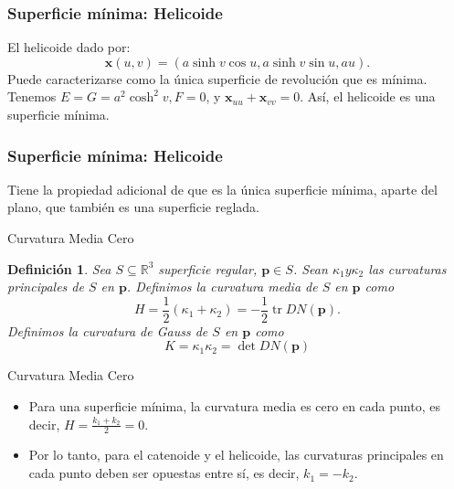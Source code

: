 \documentclass[10pt]{beamer}
\newtheorem{definicion}{Definición}
\begin{document}

  \begin{frame}
    \frametitle{Superficie mínima: Helicoide}
    El helicoide dado por: 
    $$
    \mathbf{x}(u, v)=(a \sinh v \cos u, a \sinh v \sin u, a u) .
    $$
    Puede caracterizarse como la única superficie de revolución que es mínima. Tenemos  \(E=G=a^2 \cosh ^2 v,F=0\), y \(\mathbf{x}_{u u}+\mathbf{x}_{v v}=0\). Así, el helicoide es una superficie mínima.
  \end{frame}
  
  \begin{frame}
    \frametitle{Superficie mínima: Helicoide}

    Tiene la propiedad adicional de que
  es la única superficie mínima, aparte del plano, que también es una superficie reglada.
  \end{frame}
  

  
  \begin{frame}{Curvatura Media Cero}
    \begin{cajita}
      \begin{definicion}
        Sea $S \subseteq \mathbb{R}^3$ superficie regular, $\mathbf{p} \in S$. Sean $\kappa_1 y \kappa_2$ las curvaturas principales de $S$ en $\mathbf{p}$. Definimos la curvatura media de $S$ en $\mathbf{p}$ como
  $$
  H=\frac{1}{2}\left(\kappa_1+\kappa_2\right)=-\frac{1}{2} \operatorname{tr} D N(\mathbf{p}) .
  $$
  Definimos la curvatura de Gauss de $S$ en $\mathbf{p}$ como
  $$
  K=\kappa_1 \kappa_2=\operatorname{det} D N(\mathbf{p})
  $$
      \end{definicion}
    \end{cajita}
    
    
 \end{frame}

 \begin{frame}{Curvatura Media Cero}

  \begin{itemize}
    \item Para una superficie mínima, la curvatura media es cero en cada punto, es decir, $H = \frac{k_1 + k_2}{2} = 0$.
    \item Por lo tanto, para el catenoide y el helicoide, las curvaturas principales en cada punto deben ser opuestas entre sí, es decir, $k_1 = -k_2$.
\end{itemize}
\end{frame}
\end{document}

